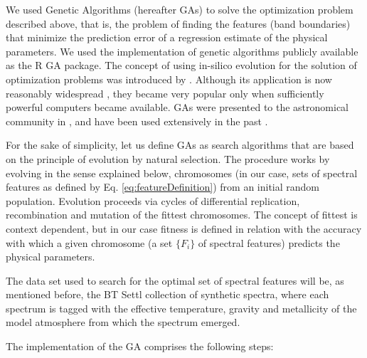 We used Genetic Algorithms (hereafter GAs) to solve the optimization
problem described above, that is, the problem of finding the features
(band boundaries) that minimize the prediction error of a regression
estimate of the physical parameters. We used the implementation of
genetic algorithms publicly available as the R \citep{R2013} GA
package. The concept of using in-silico evolution for the solution of
optimization problems was introduced
by \cite{holland1975adaptation}. Although its application is now
reasonably widespread \citep[see e.g.][]{goldberg1989genetic}, they
became very popular only when sufficiently powerful computers became
available. GAs were presented to the astronomical community
in \cite{1995ApJS..101..309C}, and have been used extensively in the
past \citep[see][for the last application of GAs in astronomy at the
time of writing]{2013A&A...550A..74D}.

For the sake of simplicity, let us define GAs as
search algorithms that are based on the principle of evolution by
natural selection. The procedure works by evolving in the sense
explained below, chromosomes (in our case, sets of spectral features
as defined by Eq. \ref{eq:featureDefinition}) from an initial random
population. Evolution proceeds via cycles of differential replication,
recombination and mutation of the fittest chromosomes. The concept of
fittest is context dependent, but in our case fitness is defined in
relation with the accuracy with which a given chromosome (a set
$\{F_i\}$ of spectral features) predicts the physical parameters.

The data set used to search for the optimal set of spectral features
will be, as mentioned before, the BT Settl collection of synthetic
spectra, where each spectrum is tagged with the effective temperature,
gravity and metallicity of the model atmosphere from which the
spectrum emerged.

The implementation of the GA comprises the following steps:


